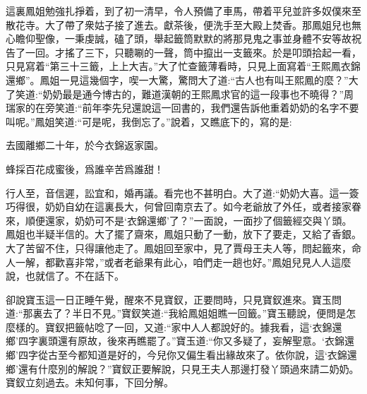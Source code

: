 \begin{parag}
    這裏鳳姐勉強扎掙着，到了初一清早，令人預備了車馬，帶着平兒並許多奴僕來至散花寺。大了帶了衆姑子接了進去。獻茶後，便洗手至大殿上焚香。那鳳姐兒也無心瞻仰聖像，一秉虔誠，磕了頭，舉起籤筒默默的將那見鬼之事並身體不安等故祝告了一回。才搖了三下，只聽唰的一聲，筒中攛出一支籤來。於是叩頭拾起一看，只見寫着“第三十三籤，上上大吉。”大了忙查籤薄看時，只見上面寫着“王熙鳳衣錦還鄉”。鳳姐一見這幾個字，喫一大驚，驚問大了道:“古人也有叫王熙鳳的麼？”大了笑道:“奶奶最是通今博古的，難道漢朝的王熙鳳求官的這一段事也不曉得？”周瑞家的在旁笑道:“前年李先兒還說這一回書的，我們還告訴他重着奶奶的名字不要叫呢。”鳳姐笑道:“可是呢，我倒忘了。”說着，又瞧底下的，寫的是:
\end{parag}


\begin{poem}
    \begin{pl}
        去國離鄉二十年，於今衣錦返家園。
    \end{pl}


    \begin{pl}
        蜂採百花成蜜後，爲誰辛苦爲誰甜！
    \end{pl}

\end{poem}


\begin{parag}
    行人至，音信遲，訟宜和，婚再議。看完也不甚明白。大了道:“奶奶大喜。這一簽巧得很，奶奶自幼在這裏長大，何曾回南京去了。如今老爺放了外任，或者接家眷來，順便還家，奶奶可不是‘衣錦還鄉’了？”一面說，一面抄了個籤經交與丫頭。鳳姐也半疑半信的。大了擺了齋來，鳳姐只動了一動，放下了要走，又給了香銀。大了苦留不住，只得讓他走了。鳳姐回至家中，見了賈母王夫人等，問起籤來，命人一解，都歡喜非常，”或者老爺果有此心，咱們走一趟也好。”鳳姐兒見人人這麼說，也就信了。不在話下。
\end{parag}


\begin{parag}
    卻說寶玉這一日正睡午覺，醒來不見寶釵，正要問時，只見寶釵進來。寶玉問道:“那裏去了？半日不見。”寶釵笑道:“我給鳳姐姐瞧一回籤。”寶玉聽說，便問是怎麼樣的。寶釵把籤帖唸了一回，又道:“家中人人都說好的。據我看，這‘衣錦還鄉’四字裏頭還有原故，後來再瞧罷了。”寶玉道:“你又多疑了，妄解聖意。‘衣錦還鄉’四字從古至今都知道是好的，今兒你又偏生看出緣故來了。依你說，這‘衣錦還鄉’還有什麼別的解說？”寶釵正要解說，只見王夫人那邊打發丫頭過來請二奶奶。寶釵立刻過去。未知何事，下回分解。
\end{parag}